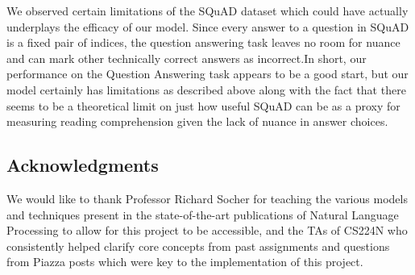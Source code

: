 \documentclass{article} %
\begin{document}
We observed certain limitations of the SQuAD dataset which could have actually underplays the efficacy of our model. Since every answer to a question in SQuAD is a fixed pair of indices, the question answering task leaves no room for nuance and can mark other technically correct answers as incorrect.In short, our performance on the Question Answering task appears to be a good start, but our model certainly has limitations as described above along with the fact that there seems to be a theoretical
limit on just how useful SQuAD can be as a proxy for measuring reading comprehension given the lack of nuance in answer choices.

\subsection{Acknowledgments}
We would like to thank Professor Richard Socher for teaching the various models and techniques
present in the state-of-the-art publications of Natural Language Processing to allow for this
project to be accessible,
and the TAs of CS224N who consistently helped clarify core concepts from past assignments
and questions from Piazza posts which were key to the implementation of this project.
\end{document}
